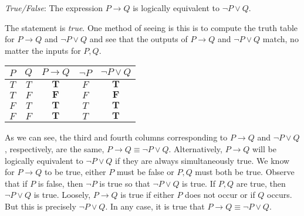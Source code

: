 \documentclass[11pt,letterpaper]{article}
\begin{document}
\thispagestyle{title}

\quizsol \textit{True/False}: The expression $P \to Q$ is logically equivalent to $\neg P \vee Q$. \pspace

\sol The statement is \textit{true}. One method of seeing is this is to compute the truth table for $P \to Q$ and $\neg P \vee Q$ and see that the outputs of $P \to Q$ and $\neg P \vee Q$ match, no matter the inputs for $P, Q$. \par
	\begin{table}[h]
	\centering
	\begin{tabular}{ccccc}
	$P$ & $Q$ & $P \to Q$ & $\neg P$ & $\neg P \vee Q$ \\ \hline 
	$T$ & $T$ & $\mathbf{T}$ & $F$ & $\mathbf{T}$ \\
	$T$ & $F$ & $\mathbf{F}$ & $F$ & $\mathbf{F}$ \\
	$F$ & $T$ & $\mathbf{T}$ & $T$ & $\mathbf{T}$ \\
	$F$ & $F$ & $\mathbf{T}$ & $T$ & $\mathbf{T}$
	\end{tabular}
	\end{table} \par
As we can see, the third and fourth columns corresponding to $P \to Q$ and $\neg P \vee Q$, respectively, are the same, $P \to Q \equiv \neg P \vee Q$. Alternatively, $P \to Q$ will be logically equivalent to $\neg P \vee Q$ if they are always simultaneously true. We know for $P \to Q$ to be true, either $P$ must be false or $P, Q$ must both be true. Observe that if $P$ is false, then $\neg P$ is true so that $\neg P \vee Q$ is true. If $P, Q$ are true, then $\neg P \vee Q$ is true. Loosely, $P \to Q$ is true if either $P$ does not occur or if $Q$ occurs. But this is precisely $\neg P \vee Q$. In any case, it is true that $P \to Q \equiv \neg P \vee Q$. \pvspace{1.3cm}
\end{document}
